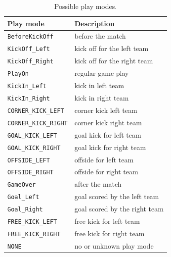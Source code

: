 \begin{table}
\centering
\begin{tabular}[htbp]{|l|l|}
  \hline
  {\bf Play mode} & {\bf Description} \\
  \hline\hline
  \texttt{BeforeKickOff} & before the match \\ \hline
  \texttt{KickOff\_Left} & kick off for the left team \\ \hline
  \texttt{KickOff\_Right} & kick off for the right team \\ \hline
  \texttt{PlayOn} & regular game play \\ \hline
  \texttt{KickIn\_Left} & kick in left team \\ \hline
  \texttt{KickIn\_Right} & kick in right team \\ \hline
  \texttt{CORNER\_KICK\_LEFT} & corner kick left team \\ \hline
  \texttt{CORNER\_KICK\_RIGHT} & corner kick right team \\ \hline
  \texttt{GOAL\_KICK\_LEFT} & goal kick for left team \\ \hline
  \texttt{GOAL\_KICK\_RIGHT} & goal kick for right team \\ \hline
  \texttt{OFFSIDE\_LEFT} & offside for left team \\ \hline
  \texttt{OFFSIDE\_RIGHT} & offside for right team \\ \hline
  \texttt{GameOver} & after the match \\ \hline
  \texttt{Goal\_Left} & goal scored by the left team \\ \hline
  \texttt{Goal\_Right} & goal scored by the right team \\ \hline
  \texttt{FREE\_KICK\_LEFT} & free kick for left team \\ \hline
  \texttt{FREE\_KICK\_RIGHT} & free kick for right team \\ \hline
  \texttt{NONE} & no or unknown play mode\\
  \hline
\end{tabular}
\caption{Possible play modes.}
\label{table:playmodes}
\end{table}%



